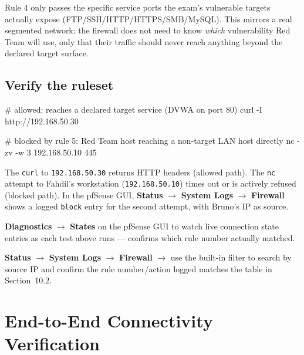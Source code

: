 \documentclass[11pt,a4paper]{article}
\begin{document}
\begin{notebox}
Rule 4 only passes the specific service ports the exam's vulnerable targets actually
expose (FTP/SSH/HTTP/HTTPS/SMB/MySQL). This mirrors a real segmented network: the
firewall does not need to know \emph{which} vulnerability Red Team will use, only that
their traffic should never reach anything beyond the declared target surface.
\end{notebox}

\subsection{Verify the ruleset}
\begin{cmdbox}
\begin{cmdverb}
# allowed: reaches a declared target service (DVWA on port 80)
curl -I http://192.168.50.30

# blocked by rule 5: Red Team host reaching a non-target LAN host directly
nc -zv -w 3 192.168.50.10 445
\end{cmdverb}
\end{cmdbox}

\begin{expectbox}
The \texttt{curl} to \texttt{192.168.50.30} returns HTTP headers (allowed path). The
\texttt{nc} attempt to Fahdil's workstation (\texttt{192.168.50.10}) times out or is
actively refused (blocked path). In the pfSense GUI, \textbf{Status} $\to$
\textbf{System Logs} $\to$ \textbf{Firewall} shows a logged \texttt{block} entry for
the second attempt, with Bruno's IP as source.
\end{expectbox}

\begin{steps}
\item \textbf{Diagnostics} $\to$ \textbf{States} on the pfSense GUI to watch live
  connection state entries as each test above runs --- confirms which rule number
  actually matched.
\item \textbf{Status} $\to$ \textbf{System Logs} $\to$ \textbf{Firewall} $\to$ use the
  built-in filter to search by source IP and confirm the rule number/action logged
  matches the table in Section~10.2.
\end{steps}

\clearpage

\section{End-to-End Connectivity Verification}
\end{document}
